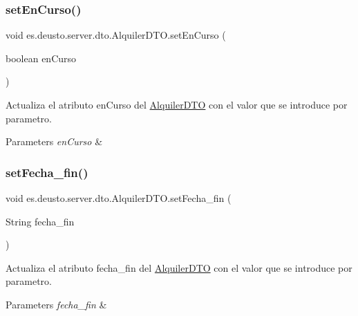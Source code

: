 \subsubsection{\texorpdfstring{setEnCurso()}{setEnCurso()}}
{\footnotesize\ttfamily void es.\+deusto.\+server.\+dto.\+Alquiler\+D\+T\+O.\+set\+En\+Curso (\begin{DoxyParamCaption}\item[{boolean}]{en\+Curso }\end{DoxyParamCaption})}

Actualiza el atributo en\+Curso del \mbox{\hyperlink{classes_1_1deusto_1_1server_1_1dto_1_1_alquiler_d_t_o}{Alquiler\+D\+TO}} con el valor que se introduce por parametro. 
\begin{DoxyParams}{Parameters}
{\em en\+Curso} & \\
\hline
\end{DoxyParams}
\mbox{\label{classes_1_1deusto_1_1server_1_1dto_1_1_alquiler_d_t_o_a525694fa1e603fe8b5460d36eee1abb9}} 
\subsubsection{\texorpdfstring{setFecha\_fin()}{setFecha\_fin()}}
{\footnotesize\ttfamily void es.\+deusto.\+server.\+dto.\+Alquiler\+D\+T\+O.\+set\+Fecha\+\_\+fin (\begin{DoxyParamCaption}\item[{String}]{fecha\+\_\+fin }\end{DoxyParamCaption})}

Actualiza el atributo fecha\+\_\+fin del \mbox{\hyperlink{classes_1_1deusto_1_1server_1_1dto_1_1_alquiler_d_t_o}{Alquiler\+D\+TO}} con el valor que se introduce por parametro. 
\begin{DoxyParams}{Parameters}
{\em fecha\+\_\+fin} & \\
\hline
\end{DoxyParams}
\mbox{\label{classes_1_1deusto_1_1server_1_1dto_1_1_alquiler_d_t_o_a46fda8afca27005c664eee147ef7a4f8}} 
